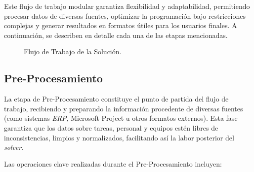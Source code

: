 \documentclass{article}
\begin{document}
Este flujo de trabajo modular garantiza flexibilidad y adaptabilidad, permitiendo procesar datos de diversas fuentes, optimizar la programación bajo restricciones complejas y generar resultados en formatos útiles para los usuarios finales. A continuación, se describen en detalle cada una de las etapas mencionadas.


\begin{figure}[htbp]
    \centering
    \caption{Flujo de Trabajo de la Solución.}
    \label{fig:solution}
\end{figure}

\subsection{Pre-Procesamiento}

La etapa de Pre-Procesamiento constituye el punto de partida del flujo de trabajo, recibiendo y preparando la información procedente de diversas fuentes (como sistemas \textit{ERP}, Microsoft Project u otros formatos externos). Esta fase garantiza que los datos sobre tareas, personal y equipos estén libres de inconsistencias, limpios y normalizados, facilitando así la labor posterior del \textit{solver}.

Las operaciones clave realizadas durante el Pre-Procesamiento incluyen:
\end{document}

